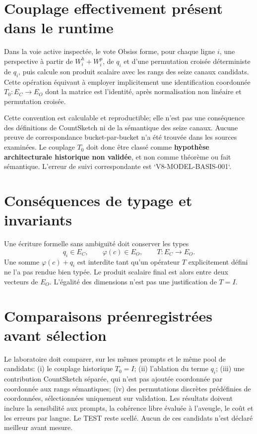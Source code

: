 \documentclass[11pt,a4paper]{report}
\begin{document}
\section{Couplage effectivement présent dans le runtime}
Dans la voie active inspectée, le vote Obsiss forme, pour chaque ligne $i$, une perspective à partir de $W_i^h+W_i^p$, de $q_i$ et d'une permutation croisée déterministe de $q_i$, puis calcule son produit scalaire avec les rangs des seize canaux candidats. Cette opération équivaut à employer implicitement une identification coordonnée $T_0:E_C\to E_O$ dont la matrice est l'identité, après normalisation non linéaire et permutation croisée.

Cette convention est calculable et reproductible; elle n'est pas une conséquence des définitions de CountSketch ni de la sémantique des seize canaux. Aucune preuve de correspondance bucket-par-bucket n'a été trouvée dans les sources examinées. Le couplage $T_0$ doit donc être classé comme \textbf{hypothèse architecturale historique non validée}, et non comme théorème ou fait sémantique. L'erreur de suivi correspondante est `V8-MODEL-BASIS-001`.

\section{Conséquences de typage et invariants}
Une écriture formelle sans ambiguïté doit conserver les types
\[
q_i\in E_C,\qquad \varphi(c)\in E_O,\qquad
T:E_C\to E_O.
\]
Une somme $\varphi(c)+q_i$ est interdite tant qu'un opérateur $T$ explicitement défini ne l'a pas rendue bien typée. Le produit scalaire final est alors entre deux vecteurs de $E_O$. L'égalité des dimensions n'est pas une justification de $T=I$.

\section{Comparaisons préenregistrées avant sélection}
Le laboratoire doit comparer, sur les mêmes prompts et le même pool de candidats: (i) le couplage historique $T_0=I$; (ii) l'ablation du terme $q_i$; (iii) une contribution CountSketch séparée, qui n'est pas ajoutée coordonnée par coordonnée aux rangs sémantiques; (iv) des permutations discrètes prédéfinies de coordonnées, sélectionnées uniquement sur validation. Les résultats doivent inclure la sensibilité aux prompts, la cohérence libre évaluée à l'aveugle, le coût et les erreurs par langue. Le TEST reste scellé. Aucun de ces candidats n'est déclaré meilleur avant mesure.
\end{document}

